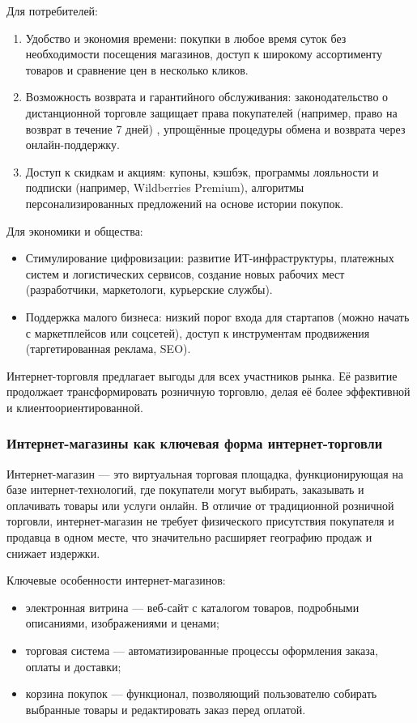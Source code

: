  Для потребителей:
 \begin{enumerate}
 	\item Удобство и экономия времени: покупки в любое время суток без необходимости посещения магазинов, доступ к широкому ассортименту товаров и сравнение цен в несколько кликов.
 	\item Возможность возврата и гарантийного обслуживания: законодательство о дистанционной торговле защищает права покупателей (например, право на возврат в течение 7 дней) \cite{3}, упрощённые процедуры обмена и возврата через онлайн-поддержку.
 	\item Доступ к скидкам и акциям: купоны, кэшбэк, программы лояльности и подписки (например, Wildberries Premium), алгоритмы персонализированных предложений на основе истории покупок.
 \end{enumerate}
 
 Для экономики и общества:
 \begin{itemize}
 	\item Стимулирование цифровизации: развитие ИТ-инфраструктуры, платежных систем и логистических сервисов, создание новых рабочих мест (разработчики, маркетологи, курьерские службы).
 	\item Поддержка малого бизнеса: низкий порог входа для стартапов (можно начать с маркетплейсов или соцсетей), доступ к инструментам продвижения (таргетированная реклама, SEO).
 \end{itemize}
 
 Интернет-торговля предлагает выгоды для всех участников рынка. Её развитие продолжает трансформировать розничную торговлю, делая её более эффективной и клиентоориентированной.
 
\subsubsection{Интернет-магазины как ключевая форма интернет-торговли}

Интернет-магазин — это виртуальная торговая площадка, функционирующая на базе интернет-технологий, где покупатели могут выбирать, заказывать и оплачивать товары или услуги онлайн. В отличие от традиционной розничной торговли, интернет-магазин не требует физического присутствия покупателя и продавца в одном месте, что значительно расширяет географию продаж и снижает издержки.

Ключевые особенности интернет-магазинов:
 \begin{itemize}
 	\item электронная витрина — веб-сайт с каталогом товаров, подробными описаниями, изображениями и ценами;
 	\item торговая система — автоматизированные процессы оформления заказа, оплаты и доставки;
 	\item корзина покупок — функционал, позволяющий пользователю собирать выбранные товары и редактировать заказ перед оплатой.
 \end{itemize}
 
